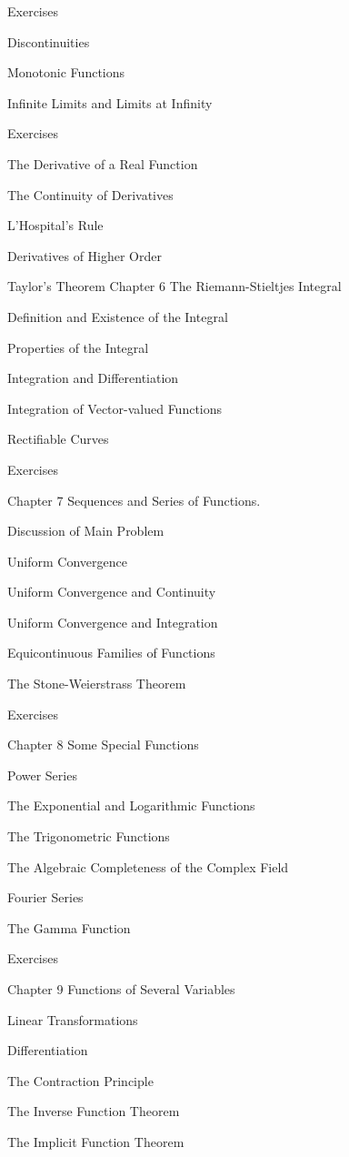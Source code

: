 \documentclass[10pt]{article}
\begin{document}
Exercises

Discontinuities

Monotonic Functions

Infinite Limits and Limits at Infinity

Exercises

The Derivative of a Real Function

The Continuity of Derivatives

L'Hospital's Rule

Derivatives of Higher Order

Taylor's Theorem Chapter 6 The Riemann-Stieltjes Integral

Definition and Existence of the Integral

Properties of the Integral

Integration and Differentiation

Integration of Vector-valued Functions

Rectifiable Curves

Exercises

Chapter 7 Sequences and Series of Functions.

Discussion of Main Problem

Uniform Convergence

Uniform Convergence and Continuity

Uniform Convergence and Integration

Equicontinuous Families of Functions

The Stone-Weierstrass Theorem

Exercises

Chapter 8 Some Special Functions

Power Series

The Exponential and Logarithmic Functions

The Trigonometric Functions

The Algebraic Completeness of the Complex Field

Fourier Series

The Gamma Function

Exercises

Chapter 9 Functions of Several Variables

Linear Transformations

Differentiation

The Contraction Principle

The Inverse Function Theorem

The Implicit Function Theorem
\end{document}

